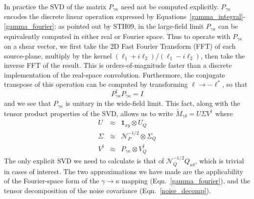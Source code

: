 \documentclass[twocolumn]{emulateapj}
\newcommand{\mymat}[1]{#1}
\begin{document}
In practice the SVD of the matrix $\mymat{P}_{\gamma\kappa}$ 
need not be computed explicitly.  
$\mymat{P}_{\gamma\kappa}$ encodes the discrete linear operation expressed
by Equations~\ref{gamma_integral}-\ref{gamma_fourier}: 
as pointed out by STH09, in the large-field limit $P_{\gamma\kappa}$ 
can be equivalently computed in either real or Fourier space.
Thus to operate with $P_{\gamma\kappa}$ on a shear vector, 
we first take the 2D Fast Fourier Transform (FFT) of each
source-plane, multiply by the kernel $(\ell_1+i\ell_2)/(\ell_1-i\ell_2)$,
then take the inverse FFT of the result.  This is orders-of-magnitude
faster than a discrete implementation of the real-space convolution.
Furthermore, the conjugate transpose of this operation can be computed
by transforming $\ell \to -\ell^*$, so that
\begin{equation}
  \mymat{P}_{\gamma\kappa}^\dagger\mymat{P}_{\gamma\kappa} = \mymat{I}
\end{equation}
and we see that $P_{\gamma\kappa}$ is unitary in the wide-field limit.  This
fact, along with the tensor product properties of the SVD, allows us to
write $\widetilde{M}_{\gamma\delta} = U\Sigma V^\dagger$ where
\begin{eqnarray}
  U &\approx& \mathbf{1}_{xy} \otimes U_Q \nonumber\\
  \Sigma &\approx& \mathcal{N}_P^{-1/2} \otimes \Sigma_Q \nonumber\\
  V^\dagger &\approx& P_{\gamma\kappa} \otimes  V_Q^\dagger
\end{eqnarray}
The only explicit SVD we need to calculate is that of 
$\mathcal{N}_Q^{-1/2}\mymat{Q}_{\kappa\delta}$,
which is trivial in cases of interest.  
The two approximations we have made are the
applicability of the Fourier-space form of the $\gamma\to\kappa$ mapping
(Eqn.~\ref{gamma_fourier}), and the tensor
decomposition of the noise covariance (Eqn.~\ref{noise_decomp}).





\end{document}
